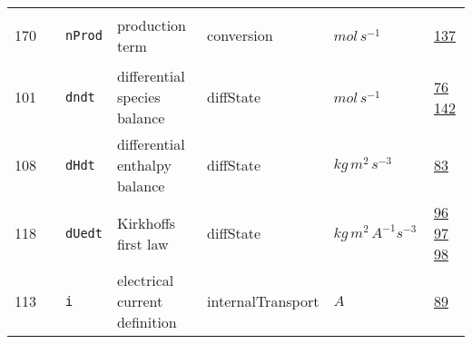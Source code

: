 \begin{longtable}{|p{1cm}|p{2.5cm}|p{4.5cm}|p{8cm}|p{3.0cm}|p{3cm}|p{1cm}|}
        170
             & \hypertarget{"v:170"}{ $ {} $}
             & \verb|nProd|
             & production term
             & \begin{lay}conversion \end{lay}
             & $ mol \,s^{-1} \, $
             &                 \hyperlink{"e:137"}{ 137 }
                 \\
        101
             & \hypertarget{"v:101"}{ $ {} $}
             & \verb|dndt|
             & differential species balance
             & \begin{lay}diffState \end{lay}
             & $ mol \,s^{-1} \, $
             &                 \hyperlink{"e:76"}{ 76 }
                                 \hyperlink{"e:142"}{ 142 }
                 \\
        108
             & \hypertarget{"v:108"}{ $ {} $}
             & \verb|dHdt|
             & differential enthalpy balance
             & \begin{lay}diffState \end{lay}
             & $ kg \,m^{2} \,s^{-3} \, $
             &                 \hyperlink{"e:83"}{ 83 }
                 \\
        118
             & \hypertarget{"v:118"}{ $ {} $}
             & \verb|dUedt|
             & Kirkhoffs first law
             & \begin{lay}diffState \end{lay}
             & $ kg \,m^{2} \,A^{-1} s^{-3} \, $
             &                 \hyperlink{"e:96"}{ 96 }
                                 \hyperlink{"e:97"}{ 97 }
                                 \hyperlink{"e:98"}{ 98 }
                 \\
        113
             & \hypertarget{"v:113"}{ $ {} $}
             & \verb|i|
             & electrical current definition
             & \begin{lay}internalTransport \end{lay}
             & $ A \, $
             &                 \hyperlink{"e:89"}{ 89 }
                 \\
    \end{longtable}